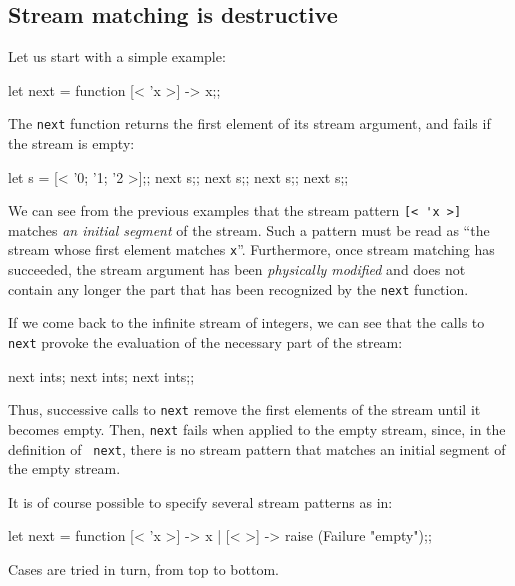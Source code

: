 \subsection{Stream matching is destructive}

Let us start with a simple example:
\begin{caml_example}
let next = function [< 'x >] -> x;;
\end{caml_example}
The {\tt next} function returns the first element of its stream
argument, and fails if the stream is empty:
\begin{caml_example}
let s = [< '0; '1; '2 >];;
next s;;
next s;;
next s;;
next s;;
\end{caml_example}
We can see from the previous examples that the stream pattern
\verb|[< 'x >]| matches {\em an initial segment} of the stream. Such a
pattern must be read as ``the stream whose first element matches
{\tt x}''. Furthermore, once stream matching has succeeded, the
stream argument has been {\em physically modified} and does not contain
any longer the part that has been recognized by the {\tt next}
function.

If we come back to the infinite stream of integers, we can see that
the calls to {\tt next} provoke the evaluation of the necessary part
of the stream:
\begin{caml_example}
next ints; next ints; next ints;;
\end{caml_example}
Thus, successive calls to {\tt next} remove the first
elements of the stream until it becomes empty. Then, {\tt next} fails
when applied to the empty stream, since, in the definition of {\tt
next}, there is no stream pattern that matches an initial segment of the
empty stream.

It is of course possible to specify several stream patterns as in:
\begin{caml_example}
let next = function
  [< 'x >] -> x
| [< >] -> raise (Failure "empty");;
\end{caml_example}
Cases are tried in turn, from top to bottom.

